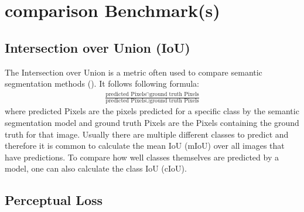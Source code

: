 \section{comparison Benchmark(s)}
\subsection{Intersection over Union (IoU)}
The Intersection over Union is a metric often used to compare semantic segmentation methods (). It follows following formula:
\begin{align*}
	\frac{\text{predicted Pixels} \cap \text{ground truth Pixels}}{\text{predicted Pixels} \cup \text{ground truth Pixels}}
\end{align*}
where predicted Pixels are the pixels predicted for a specific class by the semantic segmentation model and ground truth Pixels are the Pixels containing the ground truth for that image. Usually there are multiple different classes to predict and therefore it is common to calculate the mean IoU (mIoU) over all images that have predictions. To compare how well classes themselves are predicted by a model, one can also calculate the class IoU (cIoU).

\subsection{Perceptual Loss}

